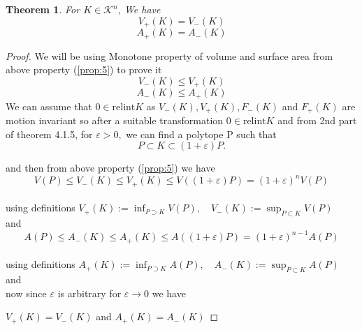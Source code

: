\documentclass[oneside]{book}
\newtheorem{theorem}{Theorem}[section]
\begin{document}
	\begin{theorem}     
		\label{t:9}
		For $K \in \mathcal{K}^{n}$, We have 
		\begin{equation}
		\label{eq46}
		V_{+}(K)=V_{-}(K)
		\end{equation}
		\begin{equation}
		\label{eq47}
		A_{+}(K)=A_{-}(K)
		\end{equation}
	\end{theorem}         
	\begin{proof}
		We will be using Monotone property of volume and surface area from above property (\ref{prop:5}) to prove it \\
		$$V_{-}(K) \leq V_{+}(K)  $$  $$ A_{-}(K) \leq A_{+}(K)$$
		We can assume that $0 \in \text{relint} K$ as  $V_{-}(K), V_{+}(K), F_{-}(K)$ and $F_{+}(K)$ are \newline motion invariant so after a suitable transformation
		$0 \in \text{relint} K$ 
		and from 2nd part of theorem 4.1.5,
		for $\varepsilon>0,$ we can find a polytope P such that 
		$$P \subset K \subset(1+\varepsilon) P .$$
		
		and then from above property (\ref{prop:5}) we have \\ 
		\[
		V(P) \leq V_{-}(K) \leq V_{+}(K) \leq V((1+\varepsilon) P)=(1+\varepsilon)^{n} V(P)
		\] \\
		using definitions $ V_{+}(K):=\inf _{P \supset K} V(P), \quad V_{-}(K):=\sup _{P \subset K} V(P)$ \\
		and   \\
		\[
		A(P) \leq A_{-}(K) \leq A_{+}(K) \leq A((1+\varepsilon) P)=(1+\varepsilon)^{n-1} A(P)
		\]  \\using definitions 
		$ A_{+}(K):=\inf _{P \supset K} A(P), \quad A_{-}(K):=\sup _{P \subset K} A(P) $
		and \\ 
		
		now since $\varepsilon $ is arbitrary for $\varepsilon \rightarrow 0$ we have 
		
		$V_{+}(K)=V_{-}(K)$ and  $A_{+}(K)=A_{-}(K)$
	\end{proof}
	
\end{document}
